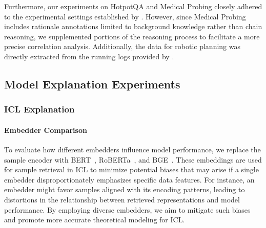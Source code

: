 Furthermore, our experiments on HotpotQA and Medical Probing closely adhered to the experimental settings established by \citet{chen2024unlocking}. However, since Medical Probing includes rationale annotations limited to background knowledge rather than chain reasoning, we supplemented portions of the reasoning process to facilitate a more precise correlation analysis. Additionally, the data for robotic planning was directly extracted from the running logs provided by \citet{valmeekam2023planbench}.

\subsection{Model Explanation Experiments}
\subsubsection{ICL Explanation}
\paragraph{Embedder Comparison}
To evaluate how different embedders influence model performance, we replace the sample encoder with BERT~\cite{devlin-etal-2019-bert}, RoBERTa~\cite{liu2019roberta}, and BGE~\cite{chen2024bge}. These embeddings are used for sample retrieval in ICL to minimize potential biases that may arise if a single embedder disproportionately emphasizes specific data features. For instance, an embedder might favor samples aligned with its encoding patterns, leading to distortions in the relationship between retrieved representations and model performance. By employing diverse embedders, we aim to mitigate such biases and promote more accurate theoretical modeling for ICL.



